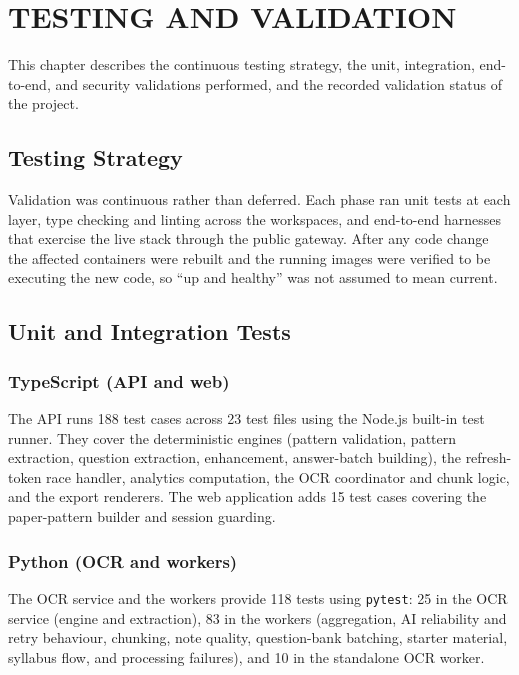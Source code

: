 \chapter{TESTING AND VALIDATION}
\thispagestyle{empty}

This chapter describes the continuous testing strategy, the unit,
integration, end-to-end, and security validations performed, and the
recorded validation status of the project.

\clearpage

\section{Testing Strategy}

Validation was continuous rather than deferred. Each phase ran unit tests at
each layer, type checking and linting across the workspaces, and end-to-end
harnesses that exercise the live stack through the public gateway. After any
code change the affected containers were rebuilt and the running images were
verified to be executing the new code, so ``up and healthy'' was not assumed
to mean current.

\section{Unit and Integration Tests}

\subsection{TypeScript (API and web)}

The API runs 188 test cases across 23 test files using the Node.js built-in
test runner. They cover the deterministic engines (pattern validation,
pattern extraction, question extraction, enhancement, answer-batch building),
the refresh-token race handler, analytics computation, the OCR coordinator
and chunk logic, and the export renderers. The web application adds 15 test
cases covering the paper-pattern builder and session guarding.

\subsection{Python (OCR and workers)}

The OCR service and the workers provide 118 tests using \texttt{pytest}: 25
in the OCR service (engine and extraction), 83 in the workers (aggregation,
AI reliability and retry behaviour, chunking, note quality, question-bank
batching, starter material, syllabus flow, and processing failures), and 10
in the standalone OCR worker.

